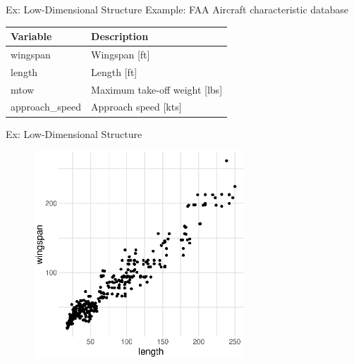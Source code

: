 \documentclass[14pt]{beamer}
\begin{document}
\begin{frame}{Ex: Low-Dimensional Structure}
  Example: FAA Aircraft characteristic database

  \bigskip
  \begin{tabular}{@{}ll@{}}
    Variable & Description \\
    \hline
    wingspan    & Wingspan [ft] \\
    length      & Length [ft] \\
    mtow        & Maximum take-off weight [lbs] \\
    approach\_speed & Approach speed [kts]
  \end{tabular}
\end{frame}

\begin{frame}{Ex: Low-Dimensional Structure}
  \begin{figure}
    \centering\includegraphics[width=0.7\textwidth]{./images/faa_wingspan_v_length}
  \end{figure}
\end{frame}
\end{document}
